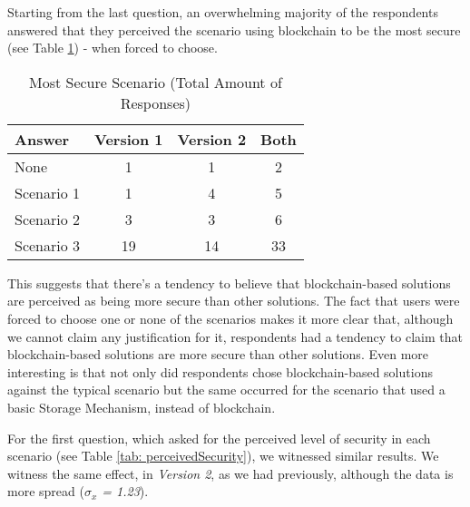 Starting from the last question, an overwhelming majority of the respondents answered that they perceived the scenario using blockchain to be the most secure (see Table \ref{tab: mostSecure}) - when forced to choose.

\begin{table}[htb]
	\centering
	\caption{Most Secure Scenario (Total Amount of Responses)}
	\label{tab: mostSecure}
	\begin{tabular}{l|ccc}
		\hline \bf Answer & \bf Version 1 & \bf Version 2 & \bf Both \\ \hline
		None              & 1             & 1             & 2        \\
		Scenario 1        & 1             & 4             & 5        \\
		Scenario 2        & 3             & 3             & 6        \\
		Scenario 3        & 19            & 14            & 33       \\
		\hline
	\end{tabular}
\end{table}

This suggests that there's a tendency to believe that blockchain-based solutions are perceived as being more secure than other solutions. The fact that users were forced to choose one or none of the scenarios makes it more clear that, although we cannot claim any justification for it, respondents had a tendency to claim that blockchain-based solutions are more secure than other solutions. Even more interesting is that not only did respondents chose blockchain-based solutions against the typical scenario but the same occurred for the scenario that used a basic Storage Mechanism, instead of blockchain.

For the first question, which asked for the perceived level of security in each scenario (see Table \ref{tab: perceivedSecurity}), we witnessed similar results. We witness the same effect, in \textit{Version 2}, as we had previously, although the data is more spread (\textit{$\sigma_{x}$ = 1.23}).

